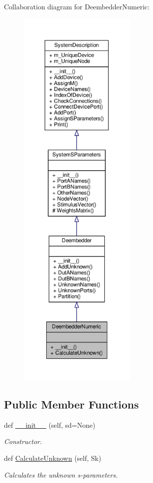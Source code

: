 Collaboration diagram for Deembedder\+Numeric\+:
\nopagebreak
\begin{figure}[H]
\begin{center}
\leavevmode
\includegraphics[height=550pt]{classSignalIntegrity_1_1SystemDescriptions_1_1DeembedderNumeric_1_1DeembedderNumeric__coll__graph}
\end{center}
\end{figure}
\subsection*{Public Member Functions}
\begin{DoxyCompactItemize}
\item 
def \hyperlink{classSignalIntegrity_1_1SystemDescriptions_1_1DeembedderNumeric_1_1DeembedderNumeric_a2fa2ae61a4511a760e2d2047ec07eb05}{\+\_\+\+\_\+init\+\_\+\+\_\+} (self, sd=None)
\begin{DoxyCompactList}\small\item\em Constructor. \end{DoxyCompactList}\item 
def \hyperlink{classSignalIntegrity_1_1SystemDescriptions_1_1DeembedderNumeric_1_1DeembedderNumeric_a35720c536433da8712e515f3c4d6ecf6}{Calculate\+Unknown} (self, Sk)
\begin{DoxyCompactList}\small\item\em Calculates the unknown s-\/parameters. \end{DoxyCompactList}\end{DoxyCompactItemize}
